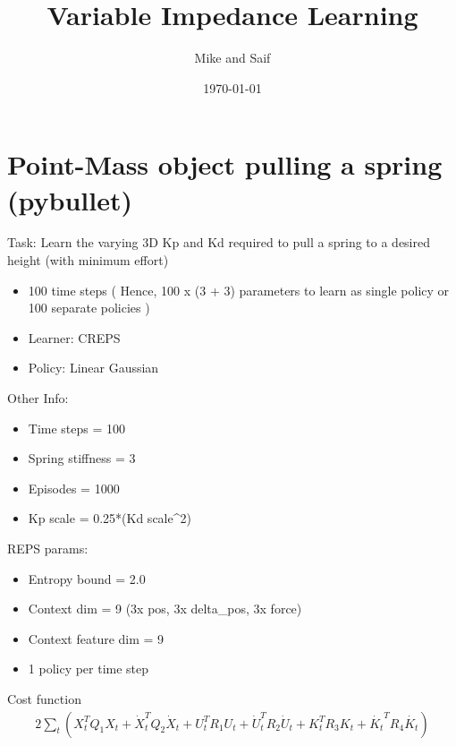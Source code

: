 \documentclass{article}%
\title{Variable Impedance Learning}%
\author{Mike and Saif}%
\date{\today}%
\begin{document}
%
\normalsize%
\maketitle%
\section{Point{-}Mass object pulling a spring (pybullet)}%
\label{sec:Point{-}Mass object pulling a spring (pybullet)}%
Task: Learn the varying 3D Kp and Kd required to pull a spring to a desired height (with minimum effort)%
\begin{itemize}%
\item%
100 time steps ( Hence, 100 x (3 + 3) parameters to learn as single policy or 100 separate policies )%
\item%
Learner: CREPS%
\item%
Policy: Linear Gaussian%
\end{itemize}%
Other Info:%
\begin{itemize}%
\item%
Time steps = 100%
\item%
Spring stiffness = 3%
\item%
Episodes = 1000%
\item%
Kp scale = 0.25*(Kd scale\^{}2)%
\end{itemize}%
REPS params:%
\begin{itemize}%
\item%
Entropy bound = 2.0%
\item%
Context dim = 9 (3x pos, 3x delta\_pos, 3x force)%
\item%
Context feature dim = 9%
\item%
1 policy per time step%
\end{itemize}%
Cost function%
\begin{alignat*}{2}%
\sum_t \left( X^T_t Q_1 X_t + \dot{X}_t^T Q_2 \dot{X}_t + U^T_t R_1 U_t + \dot{U}_t^T R_2 \dot{U}_t + K^T_t R_3 K_t + \dot{K_t}^T R_4 \dot{K_t} \right)%
\end{alignat*}

%
\end{document}
